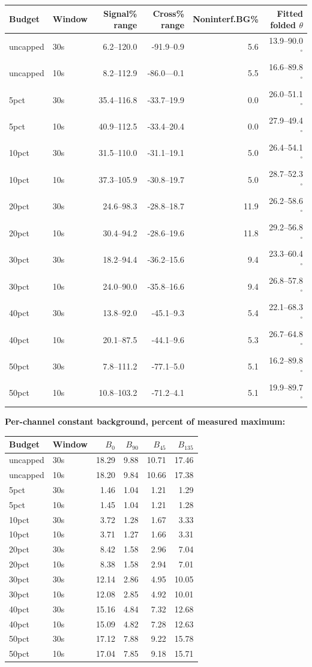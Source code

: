\documentclass[10pt,a4paper]{article}
\begin{document}
\begin{longtable}{llrrrr}\toprule
Budget & Window & Signal\% range & Cross\% range & Noninterf.BG\% & Fitted folded $\theta$\\\midrule\endhead
uncapped & 30s & 6.2--120.0 & -91.9--0.9 & 5.6 & 13.9--90.0$^\circ$ \\
uncapped & 10s & 8.2--112.9 & -86.0---0.1 & 5.5 & 16.6--89.8$^\circ$ \\
5pct & 30s & 35.4--116.8 & -33.7--19.9 & 0.0 & 26.0--51.1$^\circ$ \\
5pct & 10s & 40.9--112.5 & -33.4--20.4 & 0.0 & 27.9--49.4$^\circ$ \\
10pct & 30s & 31.5--110.0 & -31.1--19.1 & 5.0 & 26.4--54.1$^\circ$ \\
10pct & 10s & 37.3--105.9 & -30.8--19.7 & 5.0 & 28.7--52.3$^\circ$ \\
20pct & 30s & 24.6--98.3 & -28.8--18.7 & 11.9 & 26.2--58.6$^\circ$ \\
20pct & 10s & 30.4--94.2 & -28.6--19.6 & 11.8 & 29.2--56.8$^\circ$ \\
30pct & 30s & 18.2--94.4 & -36.2--15.6 & 9.4 & 23.3--60.4$^\circ$ \\
30pct & 10s & 24.0--90.0 & -35.8--16.6 & 9.4 & 26.8--57.8$^\circ$ \\
40pct & 30s & 13.8--92.0 & -45.1--9.3 & 5.4 & 22.1--68.3$^\circ$ \\
40pct & 10s & 20.1--87.5 & -44.1--9.6 & 5.3 & 26.7--64.8$^\circ$ \\
50pct & 30s & 7.8--111.2 & -77.1--5.0 & 5.1 & 16.2--89.8$^\circ$ \\
50pct & 10s & 10.8--103.2 & -71.2--4.1 & 5.1 & 19.9--89.7$^\circ$ \\
\bottomrule\end{longtable}
\textbf{Per-channel constant background, percent of measured maximum:}
\begin{longtable}{llrrrr}\toprule
Budget & Window & $B_0$ & $B_{90}$ & $B_{45}$ & $B_{135}$\\\midrule\endhead
uncapped & 30s & 18.29 & 9.88 & 10.71 & 17.46\\
uncapped & 10s & 18.20 & 9.84 & 10.66 & 17.38\\
5pct & 30s & 1.46 & 1.04 & 1.21 & 1.29\\
5pct & 10s & 1.45 & 1.04 & 1.21 & 1.28\\
10pct & 30s & 3.72 & 1.28 & 1.67 & 3.33\\
10pct & 10s & 3.71 & 1.27 & 1.66 & 3.31\\
20pct & 30s & 8.42 & 1.58 & 2.96 & 7.04\\
20pct & 10s & 8.38 & 1.58 & 2.94 & 7.01\\
30pct & 30s & 12.14 & 2.86 & 4.95 & 10.05\\
30pct & 10s & 12.08 & 2.85 & 4.92 & 10.01\\
40pct & 30s & 15.16 & 4.84 & 7.32 & 12.68\\
40pct & 10s & 15.09 & 4.82 & 7.28 & 12.63\\
50pct & 30s & 17.12 & 7.88 & 9.22 & 15.78\\
50pct & 10s & 17.04 & 7.85 & 9.18 & 15.71\\
\bottomrule\end{longtable}
\newpage
\end{document}
